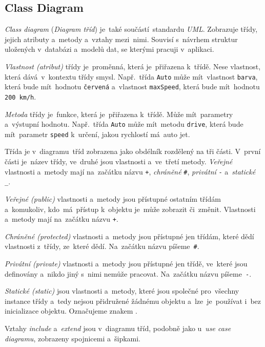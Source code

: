 \documentclass[11pt,a4paper]{report}
\begin{document}
            \subsection{Class Diagram}
                \emph{Class diagram} (\emph{Diagram tříd}) je~také součástí~standardu \emph{UML}. Zobrazuje třídy, jejich atributy a~metody a~vztahy mezi~nimi. Souvisí s~návrhem struktur uložených v~databázi a~modelů dat, se kterými pracuji v~aplikaci.

                \emph{Vlastnost (atribut)} třídy je~proměnná, která je~přiřazena k~třídě. Nese vlastnost, která dává~v~kontextu třídy smysl. Např.~třída \texttt{Auto} může mít~vlastnost \texttt{barva}, která bude mít~hodnotu \texttt{červená} a~vlastnost \texttt{maxSpeed}, která bude mít~hodnotu \texttt{200 km/h}.

                \emph{Metoda} třídy je~funkce, která je~přiřazena k~třídě. Může mít~parametry a~výstupní hodnotu. Např.~třída \texttt{Auto} může mít~metodu \texttt{drive}, která bude mít~parametr \texttt{speed} k~určení, jakou rychlostí má~auto jet.
                
                Třída je v~diagramu~tříd zobrazena jako obdélník rozdělený na tři části. V~první části je~název třídy, ve~druhé jsou vlastnosti a~ve~třetí metody. \emph{Veřejné} vlastnosti a~metody mají na~začátku názvu \texttt{+}, \emph{chráněné} \texttt{\#}, \emph{privátní} \texttt{-} a~\emph{statické} \texttt{\_}.
                
                \emph{Veřejné (public)} vlastnosti a~metody jsou přístupné ostatním třídám a~komukoliv, kdo~má~přístup k~objektu je~může zobrazit či~změnit. Vlastnosti a~metody mají na~začátku názvu \texttt{+}.

                \emph{Chráněné (protected)} vlastnosti a~metody jsou přístupné jen třídám, které dědí vlastnosti z~třídy, ze~které dědí. Na~začátku názvu píšeme~\texttt{\#}.
                
                \emph{Privátní (private)} vlastnosti a~metody jsou přístupné jen třídě, ve~které jsou definovány a~nikdo jiný s~nimi nemůže pracovat. Na~začátku názvu píšeme~\texttt{-}.
                
                \emph{Statické (static)} jsou vlastnosti a~metody, které jsou společné pro~všechny instance třídy a~tedy nejsou přidružené žádnému objektu a~lze~je~používat i~bez inicializace objektu. Označujeme znakem \texttt{\textunderscore}.
                
                Vztahy \emph{include} a~\emph{extend} jsou v~diagramu tříd, podobně jako u~\emph{use case diagramu}, zobrazeny spojnicemi a~šipkami.
\end{document}
